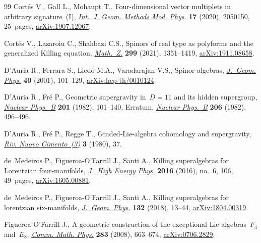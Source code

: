 \documentclass[10pt,a4paper]{amsart}
\numberwithin{equation}{section}
\newcommand{\1}{\mathbbm{1}}
\begin{document}
\begin{thebibliography}{99}
Cort\'es V., Gall L., Mohaupt T., Four-dimensional vector multiplets in
 arbitrary signature~({I}),
 \href{https://doi.org/10.1142/S0219887820501509}{\textit{Int.~J. Geom.
 Methods Mod. Phys.}} \textbf{17} (2020), 2050150, 25~pages,
 \href{http://arxiv.org/abs/1907.12067}{arXiv:1907.12067}.

Cort\'es V., Lazaroiu C., Shahbazi C.S., Spinors of real type as polyforms and
 the generalized {K}illing equation,
 \href{https://doi.org/10.1007/s00209-021-02726-6}{\textit{Math.~Z.}}
 \textbf{299} (2021), 1351--1419,
 \href{http://arxiv.org/abs/1911.08658}{arXiv:1911.08658}.

D'Auria R., Ferrara S., Lled\'o M.A., Varadarajan V.S., Spinor algebras,
 \href{https://doi.org/10.1016/S0393-0440(01)00023-7}{\textit{J.~Geom. Phys.}}
 \textbf{40} (2001), 101--129,
 \href{http://arxiv.org/abs/hep-th/0010124}{arXiv:hep-th/0010124}.

D'Auria R., Fr\'e P., Geometric supergravity in~{$D=11$} and its hidden
 supergroup,
 \href{https://doi.org/10.1016/0550-3213(82)90376-5}{\textit{Nuclear Phys.~B}}
 \textbf{201} (1982), 101--140, {E}rratum,
 \href{https://doi.org/10.1016/0550-3213(82)90281-4}{\textit{Nuclear Phys.~B}}
 \textbf{206} (1982), 496--496.

D'Auria R., Fr\'e P., Regge T., Graded-{L}ie-algebra cohomology and
 supergravity, \href{https://doi.org/10.1007/BF02905929}{\textit{Riv. Nuovo
 Cimento~(3)}} \textbf{3} (1980), 37.

de~Medeiros P., Figueroa-O'Farrill J., Santi A., Killing superalgebras for
 {L}orentzian four-manifolds,
 \href{https://doi.org/10.1007/JHEP06(2016)106}{\textit{J.~High Energy Phys.}}
 \textbf{2016} (2016), no.~6, 106, 49~pages,
 \href{http://arxiv.org/abs/1605.00881}{arXiv:1605.00881}.

de~Medeiros P., Figueroa-O'Farrill J., Santi A., Killing superalgebras for
 lorentzian six-manifolds,
 \href{https://doi.org/10.1016/j.geomphys.2018.05.019}{\textit{J.~Geom.
 Phys.}} \textbf{132} (2018), 13--44,
 \href{http://arxiv.org/abs/1804.00319}{arXiv:1804.00319}.

Figueroa-O'Farrill J., A geometric construction of the exceptional {L}ie
 algebras~{$F_4$} and~{$E_8$},
 \href{https://doi.org/10.1007/s00220-008-0581-7}{\textit{Comm. Math. Phys.}}
 \textbf{283} (2008), 663--674,
 \href{http://arxiv.org/abs/0706.2829}{arXiv:0706.2829}.


\end{thebibliography}
\end{document}
